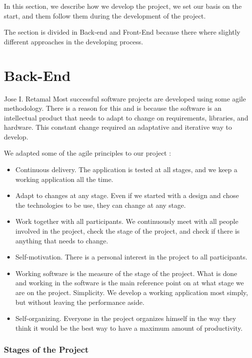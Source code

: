 \indent
\indent
In this section, we describe how we develop the project, we set our basis on the start, and them follow them during the development of the project. 

The section is divided in Back-end and Front-End because there where slightly different approaches in the developing process.
\section{Back-End}
Jose I. Retamal
\vskip 0.1in
\indent
\indent
Most successful software projects are developed using some agile methodology\cite{agilemanifesto}. There is a reason for this and is because the software is an intellectual product that needs to adapt to change on requirements, libraries, and hardware. This constant change required an adaptative and iterative way to develop.

We adapted some of the agile principles to our project \cite{agilemanifesto}:
\begin{itemize}
	\item Continuous delivery. The application is tested at all stages, and we keep a working application all the time.
	\item Adapt to changes at any stage. Even if we started with a design and chose the technologies to be use, they can change at any stage. 
   	\item 	Work together with all participants. We continuously meet with all people involved in the project, check the stage of the project, and check if there is anything that needs to change.
	\item	Self-motivation. There is a personal interest in the project to all participants.
	\item	Working software is the measure of the stage of the project. What is done and working in the software is the main reference point on at what stage we are on the project.
	Simplicity. We develop a working application most simply, but without leaving the performance aside.
	\item	Self-organizing. Everyone in the project organizes himself in the way they think it would be the best way to have a maximum amount of productivity. 
\end{itemize}



\subsubsection{Stages of the Project}

